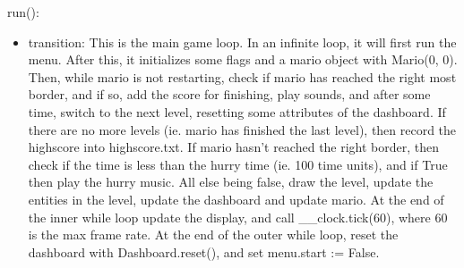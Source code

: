 \documentclass[12pt]{article}
\begin{document}
run():
\begin{itemize}
    \item transition:
    This is the main game loop. In an infinite loop, it will first run the menu. After this, it initializes some flags and a mario object with Mario(0, 0). Then, while mario is not restarting, check if mario has reached the right most border, and if so, add the score for finishing, play sounds, and after some time, switch to the next level, resetting some attributes of the dashboard. If there are no more levels (ie. mario has finished the last level), then record the highscore into highscore.txt. If mario hasn't reached the right border, then check if the time is less than the hurry time (ie. 100 time units), and if True then play the hurry music. All else being false, draw the level, update the entities in the level, update the dashboard and update mario. At the end of the inner while loop update the display, and call \_\_clock.tick(60), where 60 is the max frame rate. At the end of the outer while loop, reset the dashboard with Dashboard.reset(), and set menu.start := False.
\end{itemize}

\newpage
\end{document}
